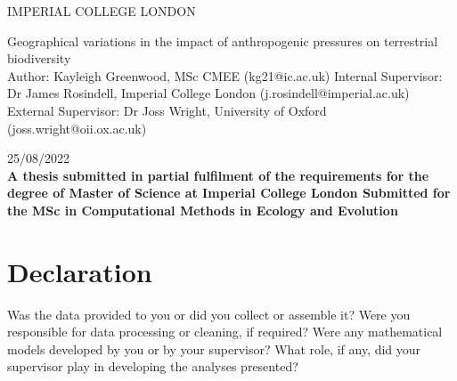\documentclass[11pt, a4paper, titlepage]{article}
\begin{document}
    \begin{titlepage}
    \begin{center}
            {\large IMPERIAL COLLEGE LONDON}
    \end{center}
    
    \vspace*{\fill}
    
    \begin{center}
        {\Huge 
    	 Geographical variations in the impact of anthropogenic pressures on terrestrial biodiversity}
        \\[2in]
        Author: Kayleigh Greenwood, MSc CMEE (kg21@ic.ac.uk)
        \bigskip
        \newline
       Internal Supervisor: Dr James Rosindell, Imperial College London (j.rosindell@imperial.ac.uk)
       \bigskip
       \newline
        External Supervisor: Dr Joss Wright, University of Oxford (joss.wright@oii.ox.ac.uk)
        \bigskip
        \newline

        25/08/2022
        \\[2in]
        
        {\bfseries A thesis submitted in partial fulfilment of the requirements for the degree of Master of Science at Imperial College London \newline \newline Submitted for the MSc in Computational Methods in Ecology and Evolution }

        

    
	\end{center}
    \vspace{\fill}
    
    \end{titlepage}
	\section*{Declaration}
	\begin{center}
	Was the data provided to you or did you collect or assemble it? \newline
	Were you responsible for data processing or cleaning, if required? \newline
	Were any mathematical models developed by you or by your supervisor? \newline
	What role, if any, did your supervisor play in developing the analyses presented?
	\end{center}
\end{document}
